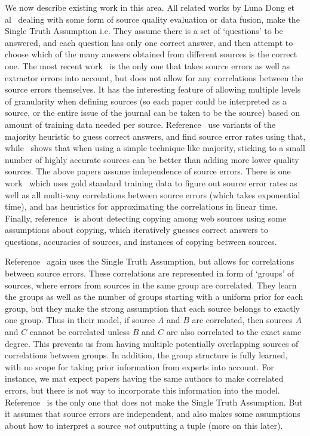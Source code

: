 \documentclass{sig-alternate}
\begin{document}
We now describe existing work in this area. All related works by Luna Dong et al~\cite{DBLP:journals/corr/DongGMDHLSZ15,6228170,Pochampally:2014:FDC:2588555.2593674,Dong:2012:LMS:2448936.2448938,Dong:2014:DFK:2732951.2732962} dealing with some form of source quality evaluation or data fusion, make the Single Truth Assumption i.e. They assume there is a set of `questions' to be answered, and each question has only one correct answer, and then attempt to choose which of the many answers obtained from different sources is the correct one. The most recent work~\cite{DBLP:journals/corr/DongGMDHLSZ15} is the only one that takes source errors as well as extractor errors into account, but does not allow for any correlations between the source errors themselves. It has the interesting feature of allowing multiple levels of granularity when defining sources (so each paper could be interpreted as a source, or the entire issue of the journal can be taken to be the source) based on amount of training data needed per source. Reference~\cite{Dong:2014:DFK:2732951.2732962} use variants of the majority heuristic to guess correct answers, and find source error rates using that, while~\cite{Dong:2012:LMS:2448936.2448938} shows that when using a simple technique like majority, sticking to a small number of highly accurate sources can be better than adding more lower quality sources. The above papers assume independence of source errors. There is one work~\cite{Pochampally:2014:FDC:2588555.2593674} which uses gold standard training data to figure out source error rates as well as all multi-way correlations between source errors (which takes exponential time), and has heuristics for approximating the correlations in linear time. Finally, reference~\cite{6228170} is about detecting copying among web sources using some assumptions about copying, which iteratively guesses correct answers to questions, accuracies of sources, and instances of copying between sources. 

Reference~\cite{Qi:2013:MCI:2488388.2488479} again uses the Single Truth Assumption, but allows for correlations between source errors. These correlations are represented in form of `groups' of sources, where errors from sources in the same group are correlated. They learn the groups as well as the number of groups starting with a uniform prior for each group, but they make the strong assumption that each source belongs to exactly one group. Thus in their model, if source $A$ and $B$ are correlated, then sources $A$ and $C$ cannot be correlated unless $B$ and $C$ are also correlated to the exact same degree. This prevents us from having multiple potentially overlapping sources of correlations between groups. In addition, the group structure is fully learned, with no scope for taking prior information from experts into account. For instance, we mat expect papers having the same authors to make correlated errors, but there is not way to incorporate this information into the model. Reference~\cite{Zhao:2012:BAD:2168651.2168656} is the only one that does not make the Single Truth Assumption. But it assumes that source errors are independent, and also makes some assumptions about how to interpret a source {\em not} outputting a tuple (more on this later). 
\end{document}
